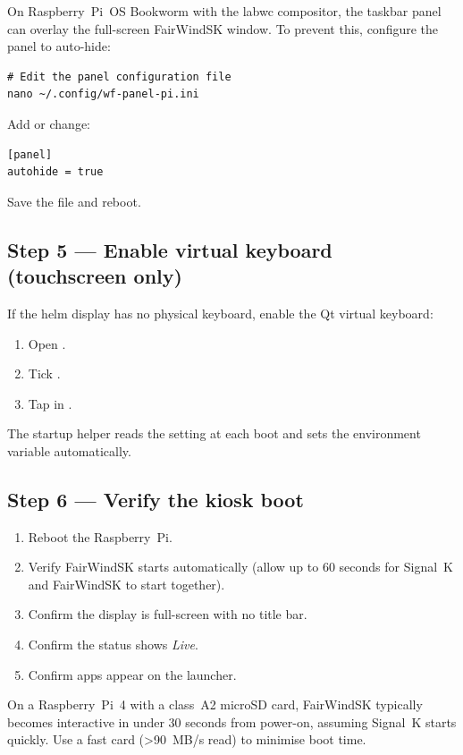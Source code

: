 On Raspberry~Pi~OS Bookworm with the labwc compositor, the taskbar
panel can overlay the full-screen FairWindSK window.
To prevent this, configure the panel to auto-hide:

\begin{lstlisting}
# Edit the panel configuration file
nano ~/.config/wf-panel-pi.ini
\end{lstlisting}

Add or change:

\begin{lstlisting}
[panel]
autohide = true
\end{lstlisting}

Save the file and reboot.

\subsection{Step 5 --- Enable virtual keyboard (touchscreen only)}

If the helm display has no physical keyboard, enable the Qt virtual
keyboard:

\begin{enumerate}
  \item Open .
  \item Tick .
  \item Tap  in .
\end{enumerate}

The startup helper reads the setting at each boot and sets the
environment variable automatically.

\subsection{Step 6 --- Verify the kiosk boot}

\begin{enumerate}
  \item Reboot the Raspberry~Pi.
  \item Verify FairWindSK starts automatically (allow up to 60 seconds
        for Signal~K and FairWindSK to start together).
  \item Confirm the display is full-screen with no title bar.
  \item Confirm the status shows \textit{Live}.
  \item Confirm apps appear on the launcher.
\end{enumerate}

\begin{tipbox}
On a Raspberry~Pi~4 with a class~A2 microSD card, FairWindSK
typically becomes interactive in under 30 seconds from power-on,
assuming Signal~K starts quickly.
Use a fast card (\textgreater{}90~MB/s read) to minimise boot time.
\end{tipbox}

